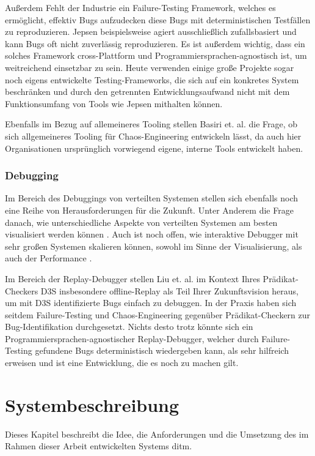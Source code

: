 \documentclass[12pt,a4paper]{report}
\begin{document}
Außerdem Fehlt der Industrie ein Failure-Testing Framework, welches es ermöglicht, effektiv Bugs aufzudecken diese Bugs mit
deterministischen Testfällen zu reproduzieren. Jepsen beispielsweise agiert ausschließlich zufallsbasiert und kann Bugs oft nicht
zuverlässig reproduzieren. Es ist außerdem wichtig, dass ein solches Framework cross-Plattform und Programmiersprachen-agnostisch
ist, um weitreichend einsetzbar zu sein. Heute verwenden einige große Projekte sogar noch eigens entwickelte Testing-Frameworks,
die sich auf ein konkretes System beschränken und durch den getrennten Entwicklungsaufwand nicht mit dem Funktionsumfang von Tools
wie Jepsen mithalten können. \cite{failify_masters_thesis}

Ebenfalls im Bezug auf allemeineres Tooling stellen Basiri et. al. \cite{chaos_engineering} die Frage, ob sich allgemeineres
Tooling für Chaos-Engineering entwickeln lässt, da auch hier Organisationen ursprünglich vorwiegend eigene, interne Tools
entwickelt haben.

\subsection{Debugging}
Im Bereich des Debuggings von verteilten Systemen stellen sich ebenfalls noch eine Reihe von Herausforderungen für die Zukunft.
Unter Anderem die Frage danach, wie unterschiedliche Aspekte von verteilten Systemen am besten visualisiert werden können
\cite{oddity_graphical_debugger}. Auch ist noch offen, wie interaktive Debugger mit sehr großen Systemen skalieren können, sowohl
im Sinne der Visualisierung, als auch der Performance \cite{gotcha_interactive_debugger}.

Im Bereich der Replay-Debugger stellen Liu et. al. \cite{d3s_predicate_checker} im Kontext Ihres Prädikat-Checkers D3S
insbesondere offline-Replay als Teil Ihrer Zukunftsvision heraus, um mit D3S identifizierte Bugs einfach zu debuggen. In der
Praxis haben sich seitdem Failure-Testing und Chaos-Engineering gegenüber Prädikat-Checkern zur Bug-Identifikation durchgesetzt.
Nichts desto trotz könnte sich ein Programmiersprachen-agnostischer Replay-Debugger, welcher durch Failure-Testing gefundene Bugs
deterministisch wiedergeben kann, als sehr hilfreich erweisen und ist eine Entwicklung, die es noch zu machen gilt.



\chapter{Systembeschreibung}
\label{chap:system}
Dieses Kapitel beschreibt die Idee, die Anforderungen und die Umsetzung des im Rahmen dieser Arbeit entwickelten Systems ditm.
\end{document}
